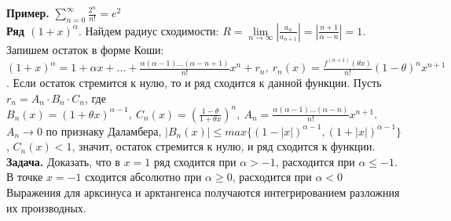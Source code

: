\textbf{Пример.} $\sum\limits_{n=0}^{\infty} \frac{2^n}{n!}=e^2$\\
\textbf{Ряд $(1+x)^\alpha$}. Найдем радиус сходимости:
$R=\lim\limits_{n \to \infty} |\frac{a_n}{a_{n+1}}|=|\frac{n+1}{\alpha-n}|=1$.
Запишем остаток в форме Коши: $(1+x)^\alpha=1+\alpha x+...+\frac{\alpha
(\alpha-1)...(\alpha-n+1)}{n!}x^n+r_n,~r_n(x)=\frac{f^{(n+1)}(\theta x)}{n!}
(1-\theta)^nx^{n+1}$. Если остаток стремится к нулю, то и ряд сходится к 
данной функции. Пусть $r_n=A_n\cdot B_n\cdot C_n$, где $B_n(x)=(1+\theta x)^{
\alpha-1},~C_n(x)=\left( \frac{1-\theta}{1+\theta x} \right)^n,~A_n=
\frac{\alpha(\alpha-1)...(\alpha-n)}{n!}x^{n+1}$. $A_n\to0$ по признаку 
Даламбера, $|B_n(x)|\leqslant max \{(1-|x|)^{\alpha-1},(1+|x|)^{\alpha-1}\}$,
$C_n(x)<1$, значит, остаток стремится к нулю, и ряд сходится к функции.\\
\textbf{Задача.} Доказать, что в $x=1$ ряд сходится при $\alpha>-1$,
расходится при $\alpha\leqslant -1$. В точке $x=-1$ сходится абсолютно при
 $\alpha\geqslant0$, расходится при $\alpha<0$\\
Выражения для арксинуса и арктангенса получаются интегрированием разложния
их производных. \\





